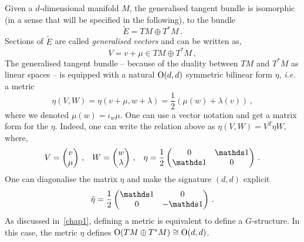\documentclass[debug]{phd}
\begin{document}
					Given a $d$-dimensional manifold $M$, the generalised tangent bundle is isomorphic (in a sense that will be specified in the following), to the bundle~\cite{gualtphd, hitch1}
							\begin{equation}
								\tilde{E} = TM \oplus T^*M \, .
							\end{equation}
					Sections of $\tilde{E}$ are called \emph{generalised vectors} and can be written as,
							\begin{equation}
								V = v + \mu \in TM \oplus T^*M\, , 
							\end{equation}
					The generalised tangent bundle -- because of the duality between $TM$ and $T^*M$ as linear spaces -- is equipped with a natural $\mathrm{O}(d,d)$ symmetric bilinear form $\eta$, \emph{i.e.} a metric
							\begin{equation}
								\eta(V , W) = \eta(v+\mu , w + \lambda ) = \frac{1}{2} \left( \mu(w) + \lambda(v) \right) \, ,
							\end{equation}
					where we denoted $\mu(w) = \iota_w \mu$.
					One can use a vector notation and get a matrix form for the $\eta$.
					Indeed, one can write the relation above as $\eta(V , W) = V^T \eta W$, where,
							\begin{align}
								V = \begin{pmatrix}
								 v \\
								 \mu
								\end{pmatrix}\, , & & W = \begin{pmatrix}
								 w \\
								 \lambda
								\end{pmatrix}\, , & & \eta = \frac{1}{2} \begin{pmatrix}
									0 & \id \\
									\id & 0 
								\end{pmatrix}\, .
							\end{align}
					One can diagonalise the matrix $\eta$ and make the signature $(d,d)$ explicit
							\begin{equation}
								\tilde{\eta} = \frac{1}{2} \begin{pmatrix}
									\id & 0\\
									0 & -\id 
								\end{pmatrix}\, .
							\end{equation}
					As discussed in~\cref{chap1}, defining a metric is equivalent to define a $G$-structure.
					In this case, the metric $\eta$ defines $\mathrm{O}(TM \oplus T^*M) \cong \mathrm{O}(d,d)$.
					
\end{document}
